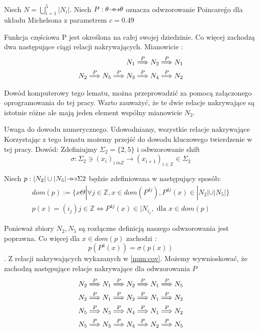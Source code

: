 Niech $ N = \bigcup^5_{i=1} | N_i| $. Niech $ P : \theta {\mathrel{\longrightarrow\mkern-25mu\circ}\;\;} \theta $ oznacza odwzorowanie Poincare\'go dla 
układu Michelsona z parametrem $ c = 0.49 $

\begin{lemma}
\label{num:cov}
 Funkcja częściowa P jest określona na całej swojej dziedzinie.
 Co więcej zachodzą dwa następujące ciągi relacji nakrywających. Mianowicie :
 \begin{eqnarray*}
    N_1 \stackrel{P}{\Longrightarrow} N_2 \stackrel{P}{\Longrightarrow} N_1 \\
    N_2 \stackrel{P}{\Longrightarrow} N_5 \stackrel{P}{\Longrightarrow} N_3 \stackrel{P}{\Longrightarrow} N_4 \stackrel{P}{\Longrightarrow} N_2 
 \end{eqnarray*}
 
 Dowód komputerowy tego lematu, można przeprowadzić za pomocą załączonego oprogramowania do tej pracy.
 Warto zauważyć, że te dwie relacje nakrywające są istotnie różne ale mają jeden element wspólny mianowicie $ N_2 $.
 

\end{lemma}
Uwaga do dowodu numerycznego. Udowodniamy, wszystkie relacje nakrywające 
Korzystając z tego lematu możemy przejść do dowodu kluczowego twierdzenie w tej pracy.
Dowód:
Zdefiniujmy $ \Sigma_2 = \{ 2,5 \} $ i odwzorowanie shift 
$$
  \sigma : \Sigma_2 \ni (x_i)_{i \ in \mathbb Z} \to (x_{i+1})_{i \in \mathbb Z } \in \Sigma_2
$$

Niech $ p : | N_2 | \cup | N_5 | {\mathrel{\longrightarrow\mkern-25mu\circ}\;\;} \Sigma2 $ będzie zdefiniowana w następujący sposób:
\begin{eqnarray*}
  dom(p) := \{ x \Theta | \forall j \in \mathbb Z, x \in dom(P^{4j}), P^{4j}(x) \in |N_2| \cup |N_5| \} \\ 
  p(x) = (i_j) j \in \mathbb Z \Leftrightarrow P^{4j}(x) \in |N_{i_j}, \text{ dla } x \in dom(p)
\end{eqnarray*}

Ponieważ zbiory $ N_2, N_5 $ są rozłączne definicją naszego odwzorowania jest poprawna. Co więcej dla $ x \in dom(p) $ zachodzi :
$$
  p(P^4(x)) = \sigma(p(x))
$$
.
Z relacji nakrywających wykazanych w \ref{num:cov}. Możemy wywnioskować, że zachodzą następujące relacje nakrywające dla odwzorowania $ P $
\begin{eqnarray*}
  N_2 \stackrel{P}{\Longrightarrow} N_1 \stackrel{P}{\Longrightarrow} N_2 \stackrel{P}{\Longrightarrow} N_1 \stackrel{P}{\Longrightarrow} N_5 \\
  N_2 \stackrel{P}{\Longrightarrow} N_1 \stackrel{P}{\Longrightarrow} N_2 \stackrel{P}{\Longrightarrow} N_1 \stackrel{P}{\Longrightarrow} N_2 \\
  N_5 \stackrel{P}{\Longrightarrow} N_3 \stackrel{P}{\Longrightarrow} N_4 \stackrel{P}{\Longrightarrow} N_1 \stackrel{P}{\Longrightarrow} N_2 \\
  N_5 \stackrel{P}{\Longrightarrow} N_3 \stackrel{P}{\Longrightarrow} N_4 \stackrel{P}{\Longrightarrow} N_2 \stackrel{P}{\Longrightarrow} N_5
\end{eqnarray*}


